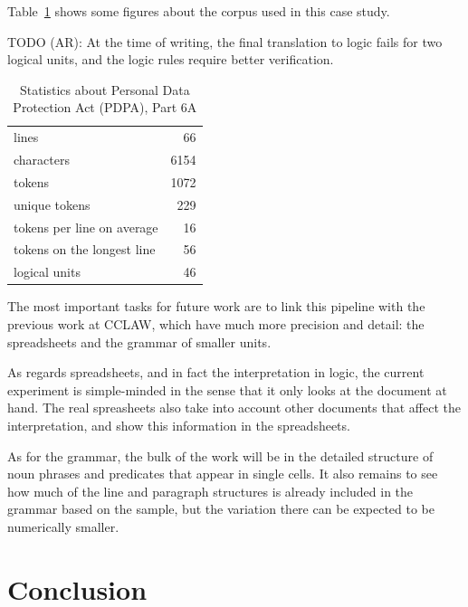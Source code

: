 \documentclass{IOS-Book-Article}
\begin{document}
Table~\ref{stats} shows some figures about the corpus used in this case study.

TODO (AR): At the time of writing, the final translation to logic fails for two logical units, and the logic rules require better verification.


\begin{table}
  \begin{tabular}{|l|r|}
\hline
lines & 66 \\
characters & 6154 \\
tokens & 1072 \\
unique tokens & 229 \\
tokens per line on average & 16 \\
tokens on the longest line & 56 \\
logical units & 46 \\
\hline
  \end{tabular}
  \caption{Statistics about Personal Data Protection Act (PDPA), Part 6A}
  \label{stats}
\end{table}

The most important tasks for future work are to link this pipeline with the previous work at CCLAW, which have much more precision and detail: the spreadsheets and the grammar of smaller units.

As regards spreadsheets, and in fact the interpretation in logic, the current experiment is simple-minded in the sense that it only looks at the document at hand.
The real spreasheets also take into account other documents that affect the interpretation, and show this information in the spreadsheets.

As for the grammar, the bulk of the work will be in the detailed structure of noun phrases and predicates that appear in single cells.
It also remains to see how much of the line and paragraph structures is already included in the grammar based on the sample, but the variation there can be expected to be numerically smaller.



\section{Conclusion}



\end{document}
